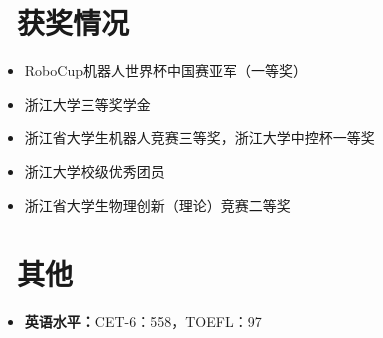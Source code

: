\documentclass[11pt]{article}
\newlength{\interProjectSpacing}
\newcommand{\projectsep}{\vspace{\interProjectSpacing}}
\begin{document}
\projectsep


\section{\makebox[\widthof{\faList}][c]{\color{CVBlue}\faList}\ 获奖情况}
\begin{itemize}[nosep]
    \item RoboCup机器人世界杯中国赛亚军（一等奖）
    \item 浙江大学三等奖学金
    \item 浙江省大学生机器人竞赛三等奖，浙江大学中控杯一等奖
    \item 浙江大学校级优秀团员
    \item 浙江省大学生物理创新（理论）竞赛二等奖
\end{itemize}

\section{\makebox[\widthof{\faInfo}][c]{\color{CVBlue}\faInfo}\ 其他}
\begin{itemize}[parsep=0.5ex]
    \item \textbf{英语水平：}CET-6：558，TOEFL：97
\end{itemize}
\end{document}
